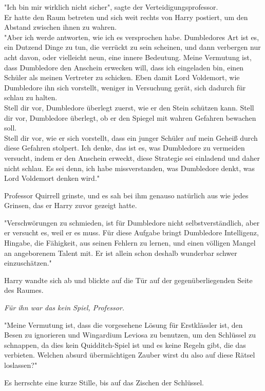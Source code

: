 {"Ich bin mir wirklich nicht sicher", sagte der Verteidigungsprofessor.\\ Er hatte den Raum betreten und sich weit rechts von Harry postiert, um den Abstand zwischen ihnen zu wahren.\\ "Aber ich werde antworten, wie ich es versprochen habe. Dumbledores Art ist es, ein Dutzend Dinge zu tun, die verrückt zu sein scheinen, und dann verbergen nur acht davon, oder vielleicht neun, eine innere Bedeutung. Meine Vermutung ist, dass Dumbledore den Anschein erwecken will, dass ich eingeladen bin, einen Schüler als meinen Vertreter zu schicken. Eben damit Lord Voldemort, wie Dumbledore ihn sich vorstellt, weniger in Versuchung gerät, sich dadurch für schlau zu halten.\\ Stell dir vor, Dumbledore überlegt zuerst, wie er den Stein schützen kann. Stell dir vor, Dumbledore überlegt, ob er den Spiegel mit wahren Gefahren bewachen soll.\\ Stell dir vor, wie er sich vorstellt, dass ein junger Schüler auf mein Geheiß durch diese Gefahren stolpert. Ich denke, das ist es, was Dumbledore zu vermeiden versucht, indem er den Anschein erweckt, diese Strategie sei einladend und daher nicht schlau. Es sei denn, ich habe missverstanden, was Dumbledore denkt, was Lord Voldemort denken wird."

Professor Quirrell grinste, und es sah bei ihm genauso natürlich aus wie jedes Grinsen, das er Harry zuvor gezeigt hatte.

"Verschwörungen zu schmieden, ist für Dumbledore nicht selbstverständlich, aber er versucht es, weil er es muss. Für diese Aufgabe bringt Dumbledore Intelligenz, Hingabe, die Fähigkeit, aus seinen Fehlern zu lernen, und einen völligen Mangel an angeborenem Talent mit. Er ist allein schon deshalb wunderbar schwer einzuschätzen."

Harry wandte sich ab und blickte auf die Tür auf der gegenüberliegenden Seite des Raumes.

\emph{Für ihn war das kein Spiel, Professor.}

"Meine Vermutung ist, dass die vorgesehene Lösung für Erstklässler ist, den Besen zu ignorieren und Wingardium Leviosa zu benutzen, um den Schlüssel zu schnappen, da dies kein Quidditch-Spiel ist und es keine Regeln gibt, die das verbieten. Welchen absurd übermächtigen Zauber wirst du also auf diese Rätsel loslassen?"

Es herrschte eine kurze Stille, bis auf das Zischen der Schlüssel.

}
